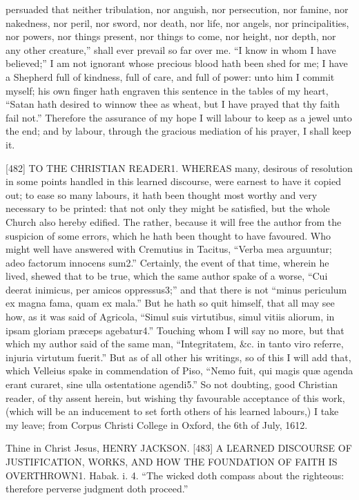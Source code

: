 persuaded that neither tribulation, nor anguish, nor persecution, nor famine, nor nakedness, nor peril, nor sword, nor death, nor life, nor angels, nor principalities, nor powers, nor things present, nor things to come, nor height, nor depth, nor any other creature,” shall ever prevail so far over me. “I know in whom I have believed;” I am not ignorant whose precious blood hath been shed for me; I have a Shepherd full of kindness, full of care, and full of power: unto him I commit myself; his own finger hath engraven this sentence in the tables of my heart, “Satan hath desired to winnow thee as wheat, but I have prayed that thy faith fail not.” Therefore the assurance of my hope I will labour to keep as a jewel unto the end; and by labour, through the gracious mediation of his prayer, I shall keep it.

[482]
TO THE CHRISTIAN READER1.
WHEREAS many, desirous of resolution in some points handled in this learned discourse, were earnest to have it copied out; to ease so many labours, it hath been thought most worthy and very necessary to be printed: that not only they might be satisfied, but the whole Church also hereby edified. The rather, because it will free the author from the suspicion of some errors, which he hath been thought to have favoured. Who might well have answered with Cremutius in Tacitus, “Verba mea arguuntur; adeo factorum innocens sum2.” Certainly, the event of that time, wherein he lived, shewed that to be true, which the same author spake of a worse, “Cui deerat inimicus, per amicos oppressus3;” and that there is not “minus periculum ex magna fama, quam ex mala.” But he hath so quit himself, that all may see how, as it was said of Agricola, “Simul suis virtutibus, simul vitiis aliorum, in ipsam gloriam præceps agebatur4.” Touching whom I will say no more, but that which my author said of the same man, “Integritatem, &c. in tanto viro referre, injuria virtutum fuerit.” But as of all other his writings, so of this I will add that, which Velleius spake in commendation of Piso, “Nemo fuit, qui magis quæ agenda erant curaret, sine ulla ostentatione agendi5.” So not doubting, good Christian reader, of thy assent herein, but wishing thy favourable acceptance of this work, (which will be an inducement to set forth others of his learned labours,) I take my leave; from Corpus Christi College in Oxford, the 6th of July, 1612.

Thine in Christ Jesus,
HENRY JACKSON.
[483]
A LEARNED DISCOURSE OF JUSTIFICATION, WORKS, AND HOW THE FOUNDATION OF FAITH IS OVERTHROWN1.
Habak. i. 4.
“The wicked doth compass about the righteous: therefore perverse judgment doth proceed.”

